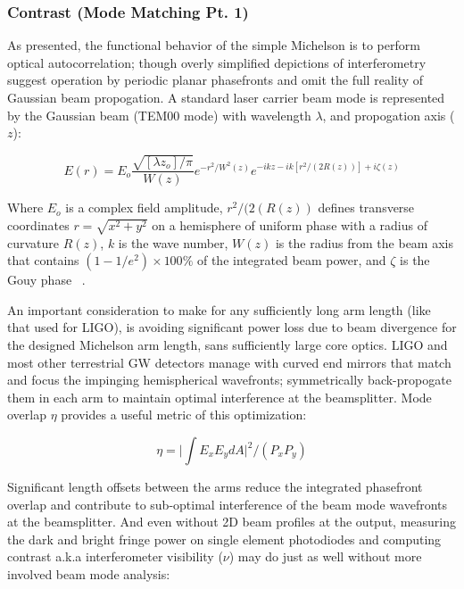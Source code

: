 \subsubsection{Contrast (Mode Matching Pt. 1)}
As presented, the functional behavior of the simple Michelson is to perform optical autocorrelation; though overly simplified depictions of interferometry suggest operation by periodic planar phasefronts and omit the full reality of Gaussian beam propogation. A standard laser carrier beam mode is represented by the Gaussian beam (TEM00 mode) with wavelength $\lambda$, and propogation axis ($z$):

\begin{equation}\label{eq:Gaussianbeam}
E(r) = E_o \frac{\sqrt{[\lambda z_o] / \pi}}{W(z)}e^{-r^2 / W^2(z)} e^{-ikz - ik[r^2 / (2R(z))] + i \zeta(z)}
\end{equation}

Where $E_o$ is a complex field amplitude, $r^{2}/(2(R(z))$ defines transverse coordinates $r = \sqrt{x^{2} + y^{2}}$ on a hemisphere of uniform phase with a radius of curvature $R(z)$, $k$ is the wave number, $W(z)$ is the radius from the beam axis that contains $(1-1/e^2) \times 100 \%$ of the integrated beam power, and $\zeta$ is the Gouy phase ~\cite{salehteich:2007}. 

An important consideration to make for any sufficiently long arm length (like that used for LIGO), is avoiding significant power loss due to beam divergence for the designed Michelson arm length, sans sufficiently large core optics. LIGO and most other terrestrial GW detectors manage with curved end mirrors that match and focus the impinging hemispherical wavefronts; symmetrically back-propogate them in each arm to maintain optimal interference at the beamsplitter. Mode overlap $\eta$ provides a useful metric of this optimization: 

\begin{equation}\label{eq:modeoverlap}
	\eta = \bigg|\int E_x E_y dA \bigg|^{2} \bigg/ (P_x P_y) 
\end{equation}

Significant length offsets between the arms reduce the integrated phasefront overlap and contribute to sub-optimal interference of the beam mode wavefronts at the beamsplitter. And even without 2D beam profiles at the output, measuring the dark and bright fringe power on single element photodiodes and computing contrast a.k.a interferometer visibility ($\nu$) may do just as well without more involved beam mode analysis:

